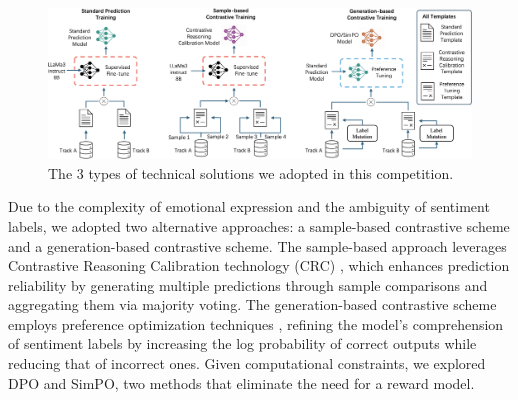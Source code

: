 \documentclass[11pt]{article}
\begin{document}
\begin{figure}[h]
  \centering
  \includegraphics[width=430pt]{Overall}
  \vspace{-5pt}
  \caption{The 3 types of technical solutions we adopted in this competition.}
  \label{fig:Overall}
 \vspace{-15pt}
\end{figure}


Due to the complexity of emotional expression and the ambiguity of sentiment labels, we adopted two alternative approaches: a sample-based contrastive scheme and a generation-based contrastive scheme. The sample-based approach leverages Contrastive Reasoning Calibration technology (CRC) \cite{li2024chinchunmei}, which enhances prediction reliability by generating multiple predictions through sample comparisons and aggregating them via majority voting. The generation-based contrastive scheme employs preference optimization techniques \cite{rafailov2023direct, hong2024orpo, meng2025simpo}, refining the model’s comprehension of sentiment labels by increasing the log probability of correct outputs while reducing that of incorrect ones. Given computational constraints, we explored DPO \cite{rafailov2023direct} and SimPO\cite{meng2025simpo}, two methods that eliminate the need for a reward model.


\end{document}
